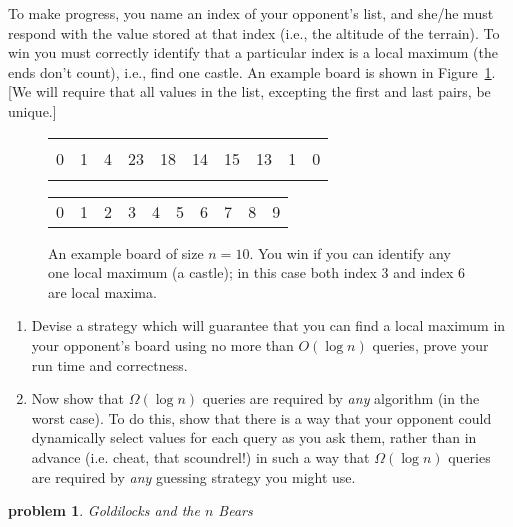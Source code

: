\documentclass[10pt]{article}
\newtheorem{problem}{\sc\color{cit}problem}
\begin{document}
To make progress, you name an index of your opponent's list, and she/he must respond with the value stored at that index (i.e., the altitude of the terrain). To win you must correctly identify that a particular index is a local maximum (the ends don't count), i.e., find one castle. An example board is shown in Figure~\ref{fig:board}. [We will require that all values in the list, excepting the first and last pairs, be unique.]

\begin{figure}[h]
    \centering
        \begin{tabularx}{0.7\textwidth}{ | *{10}{Y|} }
                \hline
                  &   &   &    &    &    &    &    &   & \\
                0 & 1 & 4 & 23 & 18 & 14 & 15 & 13 & 1 & 0\\
                  &   &   &    &    &    &    &    &   & \\
                \hline
        \end{tabularx}
        {\small\begin{tabularx}{0.7\textwidth}{  *{10}{Y} }
                0 & 1 & 2 & 3 & 4 & 5 & 6 & 7 & 8 & 9
        \end{tabularx}}

    \caption{An example board of size $n=10$. You win if you can identify any one local maximum (a castle); in this case both index $3$ and index $6$ are local maxima.}
    \label{fig:board}
\end{figure}

\begin{enumerate}
    \item Devise a strategy which will guarantee that you can find a local maximum in your opponent's board using no more than $O(\log n)$ queries, prove your run time and correctness.
    \item Now show that $\Omega(\log n)$ queries are required by \emph{any} algorithm (in the worst case). To do this, show that there is a way that your opponent could dynamically select values for each query as you ask them, rather than in advance (i.e. cheat, that scoundrel!) in such a way that $\Omega(\log n)$ queries are required by \emph{any} guessing strategy you might use.
\end{enumerate}


\begin{problem} Goldilocks and the $n$ Bears \end{problem}
\end{document}

